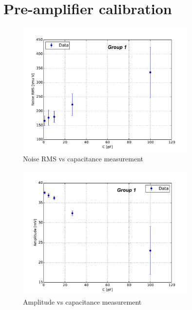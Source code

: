 \documentclass[12pt]{article}
\begin{document}
\section{Pre-amplifier calibration}

\begin{figure}[htb]
  \centering
  \includegraphics[width=0.8\textwidth]{./graphics/noise_vs_capacitance}
  \caption{Noise RMS vs capacitance measurement}
  \label{fig:Noise_vs_Capacitance}
\end{figure}

\begin{figure}[htb]
  \centering
  \includegraphics[width=0.8\textwidth]{./graphics/amplitude_vs_capacitance}
  \caption{Amplitude vs capacitance measurement}
  \label{fig:Amplitude_vs_Capacitance}
\end{figure}

\end{document}
